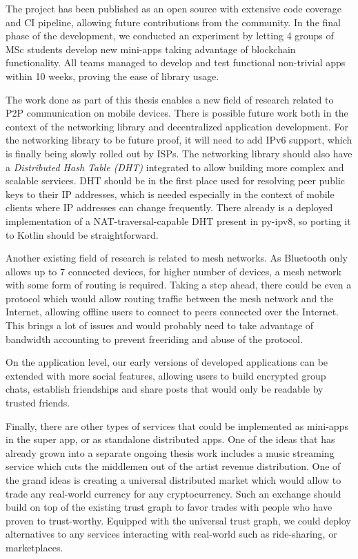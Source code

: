 The project has been published as an open source with extensive code coverage and CI pipeline, allowing future contributions from the community. In the final phase of the development, we conducted an experiment by letting 4 groups of MSc students develop new mini-apps taking advantage of blockchain functionality. All teams managed to develop and test functional non-trivial apps within 10 weeks, proving the ease of library usage.


The work done as part of this thesis enables a new field of research related to P2P communication on mobile devices. There is possible future work both in the context of the networking library and decentralized application development. For the networking library to be future proof, it will need to add IPv6 support, which is finally being slowly rolled out by ISPs. The networking library should also have a \textit{Distributed Hash Table (DHT)} integrated to allow building more complex and scalable services. DHT should be in the first place used for resolving peer public keys to their IP addresses, which is needed especially in the context of mobile clients where IP addresses can change frequently. There already is a deployed implementation of a NAT-traversal-capable DHT present in py-ipv8, so porting it to Kotlin should be straightforward.

Another existing field of research is related to mesh networks. As Bluetooth only allows up to 7 connected devices, for higher number of devices, a mesh network with some form of routing is required. Taking a step ahead, there could be even a protocol which would allow routing traffic between the mesh network and the Internet, allowing offline users to connect to peers connected over the Internet. This brings a lot of issues and would probably need to take advantage of bandwidth accounting to prevent freeriding and abuse of the protocol.

On the application level, our early versions of developed applications can be extended with more social features, allowing users to build encrypted group chats, establish friendships and share posts that would only be readable by trusted friends.

Finally, there are other types of services that could be implemented as mini-apps in the super app, or as standalone distributed apps. One of the ideas that has already grown into a separate ongoing thesis work includes a music streaming service which cuts the middlemen out of the  artist revenue distribution. One of the grand ideas is creating a universal distributed market which would allow to trade any real-world currency for any cryptocurrency. Such an exchange should build on top of the existing trust graph to favor trades with people who have proven to trust-worthy. Equipped with the universal trust graph, we could deploy alternatives to any services interacting with real-world such as ride-sharing, or marketplaces.

